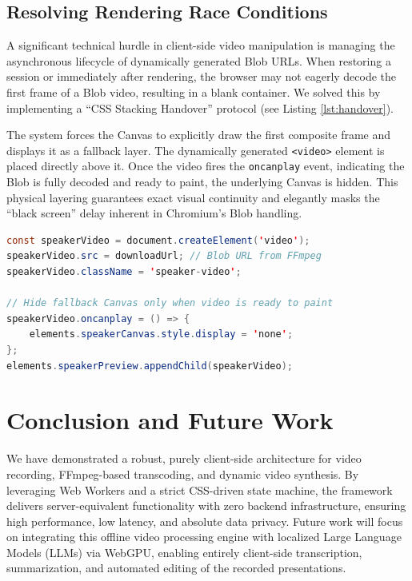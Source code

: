 \documentclass[10pt,twocolumn,letterpaper]{article}
\begin{document}
\subsection{Resolving Rendering Race Conditions}

A significant technical hurdle in client-side video manipulation is managing the asynchronous lifecycle of dynamically generated Blob URLs. When restoring a session or immediately after rendering, the browser may not eagerly decode the first frame of a Blob video, resulting in a blank container. We solved this by implementing a ``CSS Stacking Handover'' protocol (see Listing \ref{lst:handover}).


The system forces the Canvas to explicitly draw the first composite frame and displays it as a fallback layer. The dynamically generated \texttt{<video>} element is placed directly above it. Once the video fires the \texttt{oncanplay} event, indicating the Blob is fully decoded and ready to paint, the underlying Canvas is hidden. This physical layering guarantees exact visual continuity and elegantly masks the ``black screen'' delay inherent in Chromium's Blob handling.


\begin{lstlisting}[language=java,breaklines=true,breakatwhitespace=true,basicstyle=\ttfamily\small,caption={CSS Stacking Handover logic for visual continuity.},label={lst:handover}]
const speakerVideo = document.createElement('video');
speakerVideo.src = downloadUrl; // Blob URL from FFmpeg
speakerVideo.className = 'speaker-video';

// Hide fallback Canvas only when video is ready to paint
speakerVideo.oncanplay = () => {
    elements.speakerCanvas.style.display = 'none';
};
elements.speakerPreview.appendChild(speakerVideo);
\end{lstlisting}




\section{Conclusion and Future Work}

We have demonstrated a robust, purely client-side architecture for video recording, FFmpeg-based transcoding, and dynamic video synthesis. By leveraging Web Workers and a strict CSS-driven state machine, the framework delivers server-equivalent functionality with zero backend infrastructure, ensuring high performance, low latency, and absolute data privacy. Future work will focus on integrating this offline video processing engine with localized Large Language Models (LLMs) via WebGPU, enabling entirely client-side transcription, summarization, and automated editing of the recorded presentations.


\end{document}
